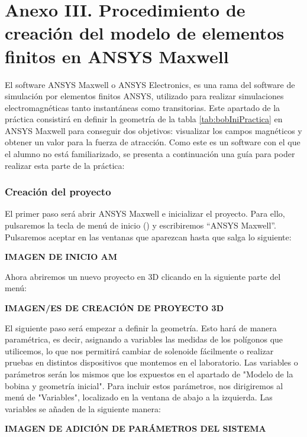 \section*{Anexo III. Procedimiento de creación del modelo de elementos finitos en ANSYS Maxwell\textsuperscript{\textregistered}}

El software ANSYS Maxwell\textsuperscript{\textregistered} o ANSYS Electronics\textsuperscript{\textregistered}, es una rama del software de simulación por elementos finitos ANSYS\textsuperscript{\textregistered}, utilizado para realizar simulaciones electromagnéticas tanto instantáneas como transitorias. Este apartado de la práctica consistirá en definir la geometría de la tabla \ref{tab:bobIniPractica} en ANSYS Maxwell\textsuperscript{\textregistered} para conseguir dos objetivos: visualizar los campos magnéticos y obtener un valor para la fuerza de atracción. Como este es un software con el que el alumno no está familiarizado, se presenta a continuación una guía para poder realizar esta parte de la práctica:

\subsubsection*{Creación del proyecto}

El primer paso será abrir ANSYS Maxwell\textsuperscript{\textregistered} e inicializar el proyecto. Para ello, pulsaremos la tecla de menú de inicio (\faWindows{}) y escribiremos ``ANSYS Maxwell\textsuperscript{\textregistered}''. Pulsaremos aceptar en las ventanas que aparezcan hasta que salga lo siguiente:

\textbf{IMAGEN DE INICIO AM}

Ahora abriremos un nuevo proyecto en 3D clicando en la siguiente parte del menú:

\textbf{IMAGEN/ES DE CREACIÓN DE PROYECTO 3D}

El siguiente paso será empezar a definir la geometría. Esto hará de manera paramétrica, es decir, asignando a variables las medidas de los polígonos que utilicemos, lo que nos permitirá cambiar de solenoide fácilmente o realizar pruebas en distintos dispositivos que montemos en el laboratorio. Las variables o parámetros serán los mismos que los expuestos en el apartado de "Modelo de la bobina y geometría inicial". Para incluir estos parámetros, nos dirigiremos al menú de "Variables", localizado en la ventana de abajo a la izquierda. Las variables se añaden de la siguiente manera:

\textbf{IMAGEN DE ADICIÓN DE PARÁMETROS DEL SISTEMA}

